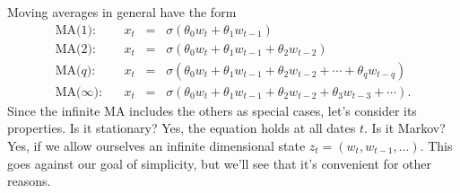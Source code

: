 \documentclass[11pt]{article}
\begin{document}
Moving averages in general have the form
\begin{eqnarray*}
    \mbox{MA(1)}:   &&  x_t \;\;=\;\;  \sigma \left( \theta_0 w_t + \theta_1 w_{t-1}\right) \\
    \mbox{MA($2$)}:   &&  x_t \;\;=\;\;  \sigma \left( \theta_0 w_t + \theta_1 w_{t-1}
                            + \theta_2 w_{t-2} \right) \\
    \mbox{MA($q$)}:   &&  x_t \;\;=\;\;  \sigma \left( \theta_0 w_t + \theta_1 w_{t-1}
                            + \theta_2 w_{t-2} + \cdots + \theta_q w_{t-q}\right) \\
    \mbox{MA($\infty$)}:   &&  x_t \;\;=\;\; \sigma \left( \theta_0 w_t + \theta_1 w_{t-1}
                            + \theta_2 w_{t-2} + \theta_3 w_{t-3} + \cdots \right).
\end{eqnarray*}
Since the infinite MA includes the others as special cases, let's consider
its properties.
Is it stationary?  Yes, the equation holds at all dates $t$.
Is it Markov?
Yes, if we allow ourselves an infinite dimensional state
$ z_{t} = (w_t, w_{t-1}, \ldots)$.
This goes against our goal of simplicity,
but we'll see that it's convenient for other reasons.
\end{document}
